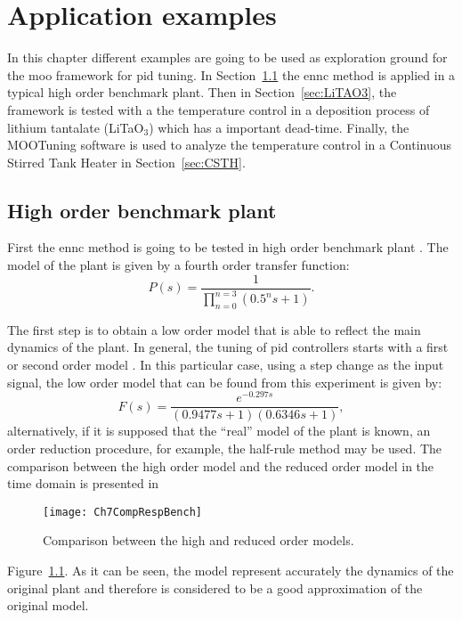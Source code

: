\chapter{Application examples}
\label{chap:ApplicationExamples}
%
%
In this chapter different examples are going to be used as exploration ground for the \gls{moo} framework for \gls{pid} tuning. In Section~\ref{sec:Bechmark} the \gls{ennc} method is applied in a typical high order benchmark plant. Then in Section~\ref{sec:LiTAO3}, the framework is tested with a the temperature control in a deposition process of lithium tantalate (LiTaO$_3$) which has a important dead-time. Finally, the MOOTuning software is used to analyze the temperature control in a Continuous Stirred Tank Heater in Section~\ref{sec:CSTH}.

\section{High order benchmark plant}
\label{sec:Bechmark}
First the \gls{ennc} method is going to be tested in high order benchmark plant \cite{Astroem2000}. The model of the plant is given by a fourth order transfer function:
\begin{equation}
P(s) = \frac{1}{\prod_{n=0}^{n=3}(0.5^n s+1)}.
\label{eq:benchmarkTF}
\end{equation}

The first step is to obtain a low order model that is able to reflect the main dynamics of the plant. In general, the tuning of \gls{pid} controllers starts with a first or second order model \cite{Alfaro2006}. In this particular case, using a step change as the input signal, the low order model that can be found from this experiment is given by:
%
\begin{equation}
F(s)=\frac{e^{-0.297s}}{(0.9477s+1)(0.6346s+1)},
\label{eq:BenchTFfit}
\end{equation}
%
alternatively, if it is supposed that the ``real'' model of the plant is known, an order reduction procedure, for example, the half-rule method \cite{Skogestad2003} may be used. The comparison between the high order model and the reduced order model in the time domain is presented in %
\begin{figure}[tb]
	\centering
	\texttt{[image: Ch7CompRespBench]}
	\caption{Comparison between the high and reduced order models.}
	\label{fig:Ch7CompRespBench}
\end{figure}
%
Figure~\ref{fig:Ch7CompRespBench}. As it can be seen, the model represent accurately the dynamics of the original plant and therefore is considered to be a good approximation of the original model.

